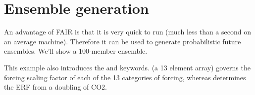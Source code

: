 \documentclass[letterpaper,10pt,english]{sphinxmanual}
\begin{document}
\begin{sphinxVerbatim}[commandchars=\\\{\}]
 
\end{sphinxVerbatim}

\noindent{}


\section{Ensemble generation}
\label{\detokenize{examples:ensemble-generation}}
An advantage of FAIR is that it is very quick to run (much less than a
second on an average machine). Therefore it can be used to generate
probabilistic future ensembles. We'll show a 100-member ensemble.

This example also introduces the  and  keywords.
 (a 13 element array) governs the forcing scaling factor of
each of the 13 categories of forcing, whereas  determines the ERF
from a doubling of CO2.
\end{document}
